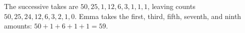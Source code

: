 The successive takes are $50,25,1,12,6,3,1,1,1$, leaving counts $50,25,24,12,6,3,2,1,0$. Emma takes the first, third, fifth, seventh, and ninth amounts: $50+1+6+1+1=\boxed{59}$.
